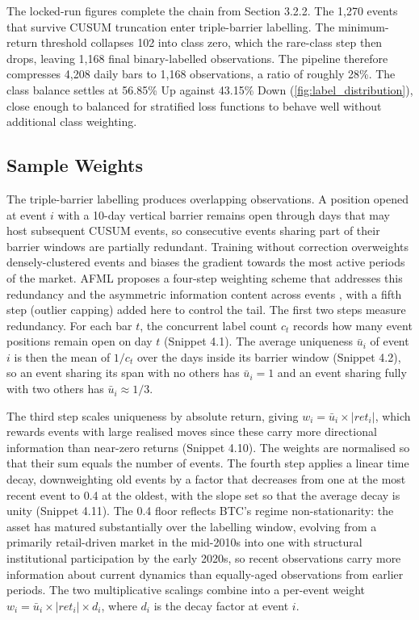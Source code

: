 \documentclass[12pt,a4paper,oneside]{article}
\begin{document}
The locked-run figures complete the chain from Section 3.2.2. The 1,270 events that survive CUSUM truncation enter triple-barrier labelling. The minimum-return threshold collapses 102 into class zero, which the rare-class step then drops, leaving 1,168 final binary-labelled observations. The pipeline therefore compresses 4,208 daily bars to 1,168 observations, a ratio of roughly 28\%. The class balance settles at 56.85\% Up against 43.15\% Down (\label{ref:label_dist_call}\autoref{fig:label_distribution}), close enough to balanced for stratified loss functions to behave well without additional class weighting.


\subsection{Sample Weights}\label{subsec:weights}

The triple-barrier labelling produces overlapping observations. A position opened at event $i$ with a 10-day vertical barrier remains open through days that may host subsequent CUSUM events, so consecutive events sharing part of their barrier windows are partially redundant. Training without correction overweights densely-clustered events and biases the gradient towards the most active periods of the market. AFML proposes a four-step weighting scheme that addresses this redundancy and the asymmetric information content across events \citep[Chapter 4]{lopez_de_prado_2018}, with a fifth step (outlier capping) added here to control the tail. The first two steps measure redundancy. For each bar $t$, the concurrent label count $c_t$ records how many event positions remain open on day $t$ (Snippet 4.1). The average uniqueness $\bar{u}_i$ of event $i$ is then the mean of $1/c_t$ over the days inside its barrier window (Snippet 4.2), so an event sharing its span with no others has $\bar{u}_i = 1$ and an event sharing fully with two others has $\bar{u}_i \approx 1/3$.

The third step scales uniqueness by absolute return, giving $w_i = \bar{u}_i \times |ret_i|$, which rewards events with large realised moves since these carry more directional information than near-zero returns (Snippet 4.10). The weights are normalised so that their sum equals the number of events. The fourth step applies a linear time decay, downweighting old events by a factor that decreases from one at the most recent event to 0.4 at the oldest, with the slope set so that the average decay is unity (Snippet 4.11). The 0.4 floor reflects BTC's regime non-stationarity: the asset has matured substantially over the labelling window, evolving from a primarily retail-driven market in the mid-2010s into one with structural institutional participation by the early 2020s, so recent observations carry more information about current dynamics than equally-aged observations from earlier periods. The two multiplicative scalings combine into a per-event weight $w_i = \bar{u}_i \times |ret_i| \times d_i$, where $d_i$ is the decay factor at event $i$.
\end{document}
